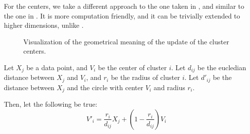 \documentclass[conference]{IEEEtran}
\begin{document}
For the centers, we take a different approach to the one taken in \cite{308484}, and similar to the one in \cite{DAVE1992713}. It is more computation friendly, and it can be
trivially extended to higher dimensions, unlike \cite{308484}.

\begin{figure}
\begin{center}
\end{center}
\caption{Visualization of the geometrical meaning of the update of the cluster centers.}
\end{figure}


Let $X_j$ be a data point, and $V_i$ be the center of cluster $i$. Let $d_{ij}$ be the eucledian distance between $X_j$ and $V_i$,
and $r_i$ be the radius of cluster $i$.
Let $d'_{ij}$ be the distance between $X_j$ and the circle with center $V_i$ and radius $r_i$.

Then, let the following be true:
\begin{equation}
V'_i = \frac{r_i}{d_{ij}}X_j + (1 - \frac{r_i}{d_{ij}})V_i
\end{equation}
\end{document}
